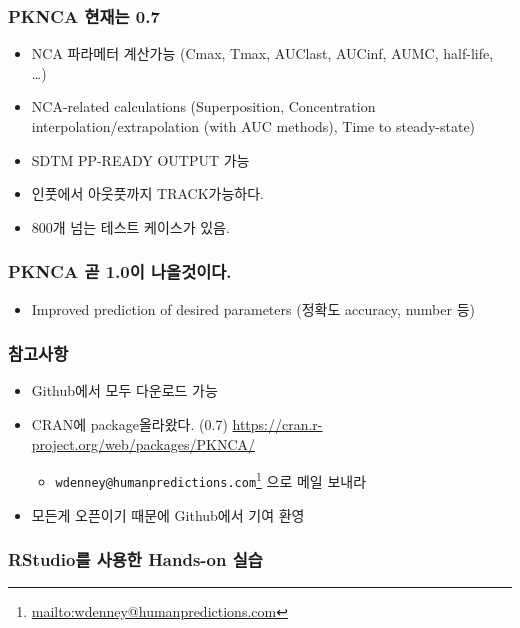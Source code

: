 \documentclass[]{krantz}
\providecommand{\tightlist}{%
  \setlength{\itemsep}{0pt}\setlength{\parskip}{0pt}}
\let\rmarkdownfootnote\footnote%
\def\footnote{\protect\rmarkdownfootnote}
\renewcommand{\href}[2]{#2\footnote{\url{#1}}}
\theoremstyle{definition}
\theoremstyle{definition}
\theoremstyle{definition}
\theoremstyle{remark}
\begin{document}
\subsubsection{PKNCA 현재는 0.7}\label{pknca--0.7}

\begin{itemize}
\tightlist
\item
  NCA 파라메터 계산가능 (Cmax, Tmax, AUClast, AUCinf, AUMC, half-life,
  \ldots{})
\item
  NCA-related calculations (Superposition, Concentration
  interpolation/extrapolation (with AUC methods), Time to steady-state)
\item
  SDTM PP-READY OUTPUT 가능
\item
  인풋에서 아웃풋까지 TRACK가능하다.
\item
  800개 넘는 테스트 케이스가 있음.
\end{itemize}

\subsubsection{PKNCA 곧 1.0이 나올것이다.}\label{pknca--1.0-.}

\begin{itemize}
\tightlist
\item
  Improved prediction of desired parameters (정확도 accuracy, number 등)
\end{itemize}

\subsubsection{참고사항}

\begin{itemize}
\tightlist
\item
  Github에서 모두 다운로드 가능
\item
  CRAN에 package올라왔다. (0.7)
  \url{https://cran.r-project.org/web/packages/PKNCA/}

  \begin{itemize}
  \tightlist
  \item
    \href{mailto:wdenney@humanpredictions.com}{\nolinkurl{wdenney@humanpredictions.com}}
    으로 메일 보내라
  \end{itemize}
\item
  모든게 오픈이기 때문에 Github에서 기여 환영
\end{itemize}

\subsubsection{RStudio를 사용한 Hands-on 실습}\label{rstudio--hands-on-}
\end{document}
